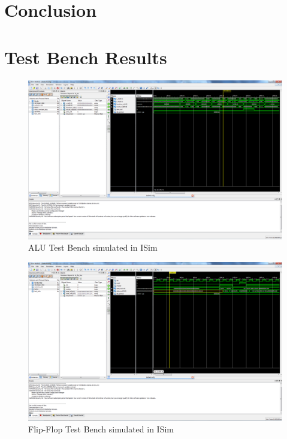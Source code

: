 \chapter{Conclusion}
	

\appendix
\chapter{Test Bench Results}
\label{appendix:tb}
\begin{figure}
    \includegraphics[width=\textwidth]{illustrations/tb_alu.PNG}
    \caption{ALU Test Bench simulated in ISim}
\end{figure}

\begin{figure}
    \includegraphics[width=\textwidth]{illustrations/tb_flip_flop.PNG}
    \caption{Flip-Flop Test Bench simulated in ISim}
\end{figure}

